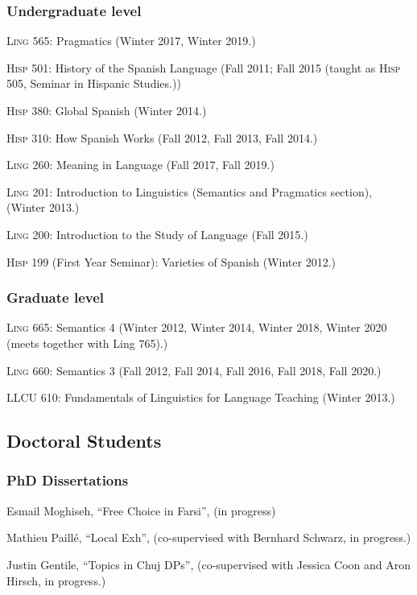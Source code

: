 \documentclass[11pt]{article}
\begin{document}
\subsubsection*{Undergraduate level}

\textsc{Ling} 565: Pragmatics (Winter 2017, Winter 2019.)

\textsc{Hisp} 501: History of the Spanish Language (Fall 2011; Fall 2015 (taught as \textsc{Hisp} 505, Seminar in Hispanic Studies.))

\textsc{Hisp} 380: Global Spanish (Winter 2014.)

\textsc{Hisp} 310: How Spanish Works (Fall 2012, Fall 2013, Fall 2014.)

\textsc{Ling} 260: Meaning in Language (Fall 2017, Fall 2019.)

\textsc{Ling} 201: Introduction to Linguistics (Semantics and Pragmatics
section), (Winter 2013.)

\textsc{Ling} 200: Introduction to the Study of Language (Fall 2015.)

\textsc{Hisp} 199 (First Year Seminar): Varieties of Spanish (Winter 2012.)

\subsubsection*{Graduate level}

\textsc{Ling} 665: Semantics 4 (Winter 2012, Winter 2014, Winter 2018, Winter 2020 (meets together with
Ling 765).)

\textsc{Ling} 660: Semantics 3 (Fall 2012, Fall 2014, Fall 2016, Fall 2018, Fall 2020.)

LLCU 610: Fundamentals of Linguistics for Language Teaching (Winter 2013.)


\subsection*{Doctoral Students}


\subsubsection*{PhD Dissertations}


Esmail Moghiseh, ``Free Choice in Farsi'', (in progress)

Mathieu Paill\'e, ``Local Exh'', (co-supervised with Bernhard Schwarz, in progress.)

Justin Gentile, ``Topics in Chuj DPs'', (co-supervised with Jessica Coon and Aron Hirsch, in progress.)
\end{document}
